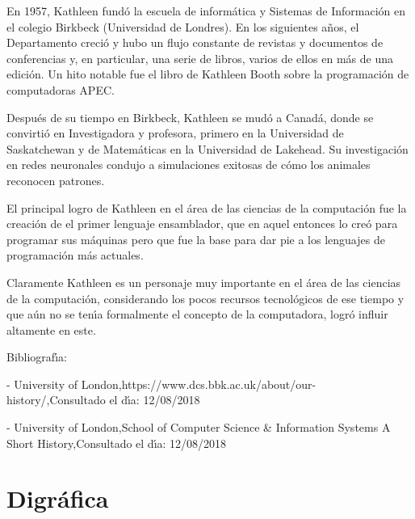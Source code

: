 \documentclass{article}
\begin{document}
En 1957, Kathleen fund\'{o}  la escuela de inform\'{a}tica  y Sistemas de Informaci\'{o}n en el colegio Birkbeck (Universidad de Londres). En los siguientes a\~{n}os, el Departamento creci\'{o} y hubo un flujo constante de revistas y documentos de conferencias y, en particular, una serie de libros, varios de ellos en m\'{a}s de una edici\'{o}n. Un hito notable fue el libro de Kathleen Booth sobre la programaci\'{o}n de computadoras APEC. \newline

Despu\'{e}s de su tiempo en Birkbeck, Kathleen se mud\'{o} a Canad\'{a}, donde se convirti\'{o} en Investigadora y profesora, primero en la Universidad de Saskatchewan y de Matem\'{a}ticas en la Universidad de Lakehead. Su investigaci\'{o}n en redes neuronales condujo a simulaciones exitosas de c\'{o}mo los animales reconocen patrones. \newline

El principal logro de  Kathleen en el \'{a}rea de las ciencias de la computaci\'{o}n fue la creaci\'{o}n de el primer lenguaje ensamblador, que en aquel entonces lo cre\'{o} para programar sus m\'{a}quinas pero que fue la base para dar pie a los lenguajes de programaci\'{o}n m\'{a}s actuales. \newline

Claramente  Kathleen es un personaje muy importante en el \'{a}rea de las ciencias de la computaci\'{o}n, considerando los pocos recursos tecnol\'{o}gicos de ese tiempo y que a\'{u}n no se ten\'{\i}a formalmente el concepto de la computadora, logr\'{o} influir altamente en este.
\newline

Bibliograf\'{\i}a:

- University of London,https://www.dcs.bbk.ac.uk/about/our-history/,Consultado el d\'{\i}a: 12/08/2018

-  University of London,School of Computer Science \& Information Systems
A Short History,Consultado el d\'{\i}a: 12/08/2018



\section{Digr\'afica}
\end{document}
